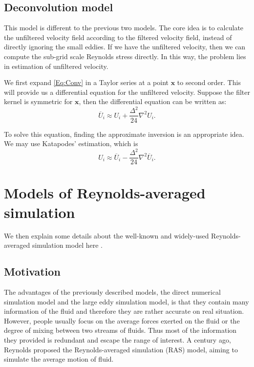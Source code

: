 \documentclass[english, nochinese]{pkupaper}
\begin{document}
\subsection{Deconvolution model}

This model is different to the previous two models. The core idea is to calculate the unfiltered velocity field according to the filtered velocity field, instead of directly ignoring the small eddies. If we have the unfiltered velocity, then we can compute the sub-grid scale Reynolds stress directly. In this way, the problem lies in estimation of unfiltered velocity.

We first expand \eqref{Eq:Conv} in a Taylor series at a point $\mathbf{x}$ to second order. This will provide us a differential equation for the unfiltered velocity. Suppose the filter kernel is symmetric for $\mathbf{x}$, then the differential equation can be written as:
\begin{equation}
\overline{U}_i \approx U_i + \frac{\Delta^2}{24}\nabla^2U_i.
\end{equation}

To solve this equation, finding the approximate inversion is an appropriate idea. We may use Katapodes' estimation, which is
\begin{equation}
U_i \approx \overline{U}_i - \frac{\Delta^2}{24}\nabla^2\overline{U}_i.
\end{equation}

\section{Models of Reynolds-averaged simulation} \label{Sec:RAS}

We then explain some details about the well-known and widely-used Reynolds-averaged simulation model here \parencite{pope_turbulent_2001} \parencite{ferziger_computational_2002}.

\subsection{Motivation}

The advantages of the previously described models, the direct numerical simulation model and the large eddy simulation model, is that they contain many information of the fluid and therefore they are rather accurate on real situation. However, people usually focus on the average forces exerted on the fluid or the degree of mixing between two streams of fluids. Thus most of the information they provided is redundant and escape the range of interest. A century ago, Reynolds proposed the Reynolds-averaged simulation (RAS) model, aiming to simulate the average motion of fluid.
\end{document}
